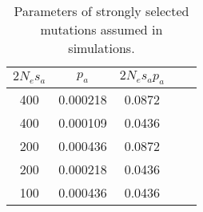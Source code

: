 \begin{table}[h!]
\centering
\caption[Parameters of strongly selected mutations assumed in simulations]{Parameters of strongly selected mutations assumed in simulations.}
 \begin{tabular}{c c c c c } 

\toprule
$2N_es_a	$ & $p_a$	& $2N_es_ap_a$ \\ \hline
400 &	0.000218	 & 0.0872 \\
400 &	0.000109	 & 0.0436 \\
200 &	0.000436	 & 0.0872 \\
200 &	0.000218	 & 0.0436 \\
100 &	0.000436	 & 0.0436 \\
\bottomrule

\end{tabular}
\label{tab:CS7}
\end{table}